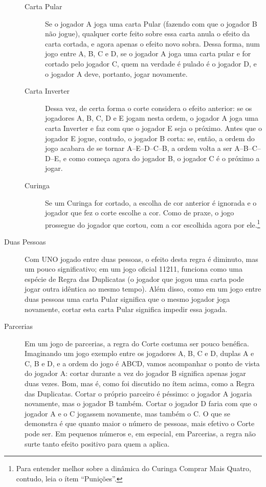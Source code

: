 \begin{description}
{\begin{description}
\item[Carta Pular]{Se o jogador A joga uma carta Pular (fazendo com que o jogador B não jogue), qualquer corte feito sobre essa carta anula o efeito da carta cortada, e agora apenas o efeito novo sobra. Dessa forma, num jogo entre A, B, C e D, se o jogador A joga uma carta pular e for cortado pelo jogador C, quem na verdade é pulado é o jogador D, e o jogador A deve, portanto, jogar novamente.}
\item[Carta Inverter]{Dessa vez, de certa forma o corte considera o efeito anterior: se os jogadores A, B, C, D e E jogam nesta ordem, o jogador A joga uma carta Inverter e faz com que o jogador E seja o próximo. Antes que o jogador E jogue, contudo, o jogador B corta: se, então, a ordem do jogo acabara de se tornar A--E--D--C--B, a ordem volta a ser A--B--C--D--E, e como começa agora do jogador B, o jogador C é o próximo a jogar.}
\item[Curinga]{Se um Curinga for cortado, a escolha de cor anterior é ignorada e o jogador que fez o corte escolhe a cor. Como de praxe, o jogo prossegue do jogador que cortou, com a cor escolhida agora por ele.\footnote{Para entender melhor sobre a dinâmica do Curinga Comprar Mais Quatro, contudo, leia o ítem ``Punições''.}}
\end{description}
}
\item[Duas Pessoas]{Com UNO jogado entre duas pessoas, o efeito desta regra é diminuto, mas um pouco significativo; em um jogo oficial 11211, funciona como uma espécie de Regra das Duplicatas (o jogador que jogou uma carta pode jogar outra idêntica ao mesmo tempo). Além disso, como em um jogo entre duas pessoas uma carta Pular significa que o mesmo jogador joga novamente, cortar esta carta Pular significa impedir essa jogada.}
\item[Parcerias]{Em um jogo de parcerias, a regra do Corte costuma ser pouco benéfica. Imaginando um jogo exemplo entre os jogadores A, B, C e D, duplas A e C, B e D, e a ordem do jogo é ABCD, vamos acompanhar o ponto de vista do jogador A: cortar durante a vez do jogador B significa apenas jogar duas vezes. Bom, mas é, como foi discutido no ítem acima, como a Regra das Duplicatas. Cortar o próprio parceiro é péssimo: o jogador A jogaria novamente, mas o jogador B também. Cortar o jogador D faria com que o jogador A e o C jogassem novamente, mas também o C. O que se demonstra é que quanto maior o número de pessoas, mais efetivo o Corte pode ser. Em pequenos números e, em especial, em Parcerias, a regra não surte tanto efeito positivo para quem a aplica.}

\end{description}
